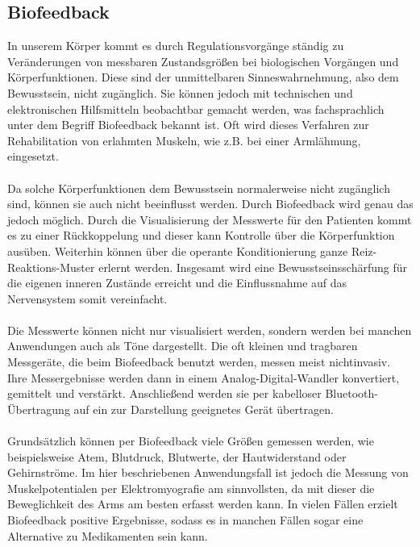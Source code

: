 \subsection{Biofeedback}
In unserem Körper kommt es durch Regulationsvorgänge ständig zu Veränderungen von messbaren Zustandsgrößen bei biologischen Vorgängen und Körperfunktionen. Diese sind der unmittelbaren Sinneswahrnehmung, also dem Bewusstsein, nicht zugänglich. Sie können jedoch mit technischen und elektronischen Hilfsmitteln beobachtbar gemacht werden, was fachsprachlich unter dem Begriff Biofeedback bekannt ist. \cite{Src:BiofeedWiki} Oft wird dieses Verfahren zur Rehabilitation von erlahmten Muskeln, wie z.B. bei einer Armlähmung, eingesetzt. \\ \\
Da solche Körperfunktionen dem Bewusstsein normalerweise nicht zugänglich sind, können sie auch nicht beeinflusst werden. Durch Biofeedback wird genau das jedoch möglich. Durch die Visualisierung der Messwerte für den Patienten kommt es zu einer Rückkoppelung und dieser kann Kontrolle über die Körperfunktion ausüben. Weiterhin können über die operante Konditionierung ganze Reiz-Reaktions-Muster erlernt werden. Insgesamt wird eine Bewusstseinsschärfung für die eigenen inneren Zustände erreicht und die Einflussnahme auf das Nervensystem somit vereinfacht. \cite{Src:BiofeedWiki} \\ \\
Die Messwerte können nicht nur visualisiert werden, sondern werden bei manchen Anwendungen auch als Töne dargestellt. Die oft kleinen und tragbaren Messgeräte, die beim Biofeedback benutzt werden, messen meist nichtinvasiv. \cite{Src:BiofeedWiki} Ihre Messergebnisse werden dann in einem Analog-Digital-Wandler konvertiert, gemittelt und verstärkt. Anschließend werden sie per kabelloser Bluetooth-Übertragung auf ein zur Darstellung geeignetes Gerät übertragen. \\ \\
Grundsätzlich können per Biofeedback viele Größen gemessen werden, wie beispielsweise Atem, Blutdruck, Blutwerte, der Hautwiderstand oder Gehirnströme. Im hier beschriebenen Anwendungsfall ist jedoch die Messung von Muskelpotentialen per Elektromyografie am sinnvollsten, da mit dieser die Beweglichkeit des Arms am besten erfasst werden kann. In vielen Fällen erzielt Biofeedback positive Ergebnisse, sodass es in manchen Fällen sogar eine Alternative zu Medikamenten sein kann. \cite{Src:BiofeedWiki}